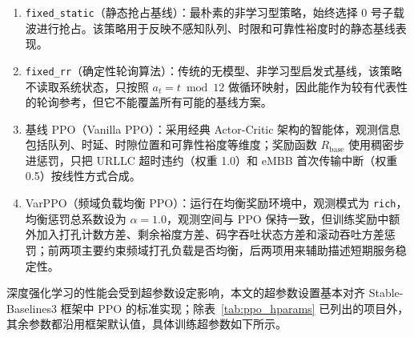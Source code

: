 \begin{enumerate}
\def\labelenumi{\arabic{enumi}.}

\item
  \texttt{fixed\_static}（静态抢占基线）：最朴素的非学习型策略，始终选择 0 号子载波进行抢占。该策略用于反映不感知队列、时限和可靠性裕度时的静态基线表现。
\item
  \texttt{fixed\_rr}（确定性轮询算法）：传统的无模型、非学习型启发式基线，该策略不读取系统状态，只按照 \(a_t = t \bmod 12\) 做循环映射，因此能作为较有代表性的轮询参考，但它不能覆盖所有可能的基线方案。
\item
  基线 PPO（Vanilla PPO）：采用经典 Actor-Critic 架构的智能体，观测信息包括队列、时延、时隙位置和可靠性裕度等维度；奖励函数 \(R_{\text{base}}\) 使用稠密步进惩罚，只把 URLLC 超时违约（权重 1.0）和 eMBB 首次传输中断（权重 0.5）按线性方式合成。
\item
  VarPPO（频域负载均衡 PPO）：运行在均衡奖励环境中，观测模式为 \texttt{rich}，均衡惩罚总系数设为 \(\alpha=1.0\)，观测空间与 PPO 保持一致，但训练奖励中额外加入打孔计数方差、剩余裕度方差、码字吞吐状态方差和滚动吞吐方差惩罚；前两项主要约束频域打孔负载是否均衡，后两项用来辅助描述短期服务稳定性。
\end{enumerate}

深度强化学习的性能会受到超参数设定影响，本文的超参数设置基本对齐 Stable-Baselines3 框架中 PPO 的标准实现；除表~\ref{tab:ppo_hparams} 已列出的项目外，其余参数都沿用框架默认值，具体训练超参数如下所示。

